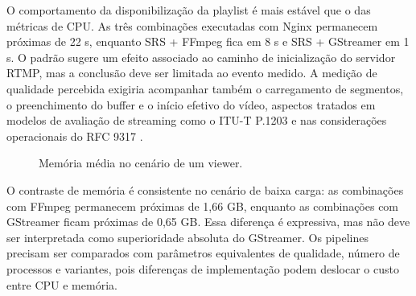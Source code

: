 O comportamento da disponibilização da playlist é mais estável que o das métricas de CPU. As três combinações executadas com Nginx permanecem próximas de 22 s, enquanto SRS + FFmpeg fica em 8 s e SRS + GStreamer em 1 s. O padrão sugere um efeito associado ao caminho de inicialização do servidor RTMP, mas a conclusão deve ser limitada ao evento medido. A medição de qualidade percebida exigiria acompanhar também o carregamento de segmentos, o preenchimento do buffer e o início efetivo do vídeo, aspectos tratados em modelos de avaliação de streaming como o ITU-T P.1203 \citep{itu1203} e nas considerações operacionais do RFC 9317 \citep{rfc9317}.

\begin{figure}[H]
\centering
{}
\caption{Memória média no cenário de um viewer.}
\label{fig:memoria-media}
\end{figure}

O contraste de memória é consistente no cenário de baixa carga: as combinações com FFmpeg permanecem próximas de 1,66 GB, enquanto as combinações com GStreamer ficam próximas de 0,65 GB. Essa diferença é expressiva, mas não deve ser interpretada como superioridade absoluta do GStreamer. Os pipelines precisam ser comparados com parâmetros equivalentes de qualidade, número de processos e variantes, pois diferenças de implementação podem deslocar o custo entre CPU e memória.

